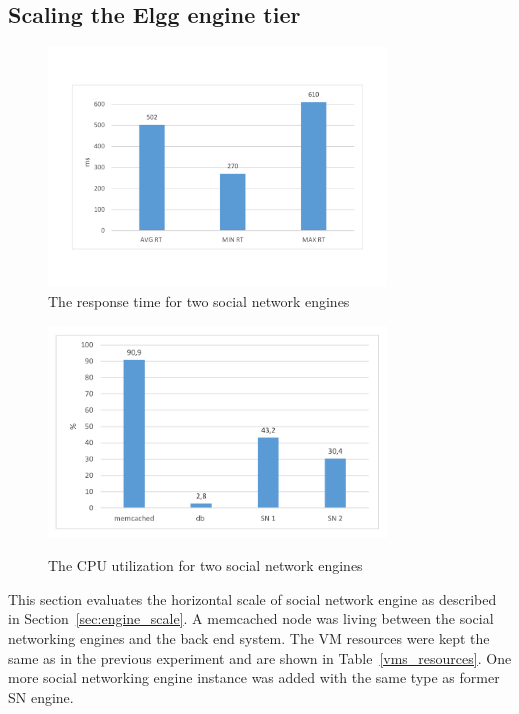 \subsection{Scaling the Elgg engine tier}

\begin{figure}[h]
	\centering
	\includegraphics[width=0.8\textwidth,natwidth=200,natheight=150]{./fig/RT2SN.pdf}
	\caption{The response time for two social network engines}
	\label{fig:rt2SN}
\end{figure}

\begin{figure}[h]
	\caption{The CPU utilization for two social network engines}
	\includegraphics[width=0.8\textwidth,natwidth=200,natheight=150]{./fig/Usage2SN.pdf}
	\centering
	\label{fig:cpu2SNavg}
\end{figure}

This section evaluates the horizontal scale of social network engine as described in Section~\ref{sec:engine_scale}. A memcached node was living between the social networking engines and the back end system. The VM resources were kept the same as in the previous experiment and are shown in Table~\ref{vms_resources}. One more social networking engine instance was added with the same type as former SN engine. 

